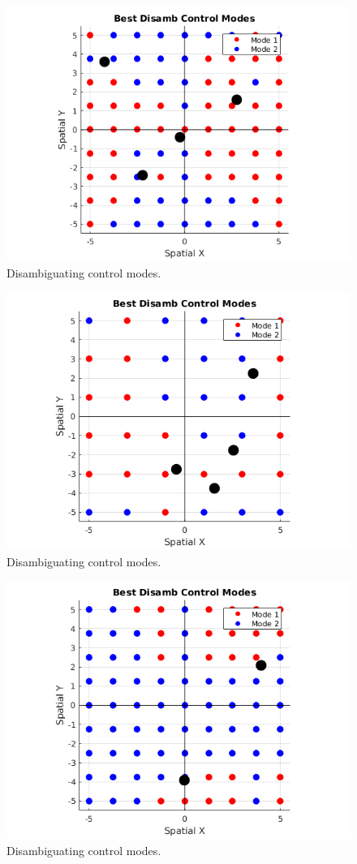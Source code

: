 \documentclass[]{article}
\begin{document}
\begin{figure}[h!]
	\centering
	\includegraphics[width = 0.6\hsize, height = 0.3\vsize]{./figures/Config5.png}
	\vspace{-0.4cm}
	\caption{Disambiguating control modes.}
\end{figure}
\begin{figure}[h!]
	\centering
	\includegraphics[width = 0.6\hsize, height = 0.3\vsize]{./figures/Config6.png}
	\vspace{-0.4cm}
	\caption{Disambiguating control modes.}
\end{figure}
\begin{figure}[h!]
	\centering
	\includegraphics[width = 0.6\hsize, height = 0.3\vsize]{./figures/Config7.png}
	\vspace{-0.4cm}
	\caption{Disambiguating control modes.}
\end{figure}
\end{document}
